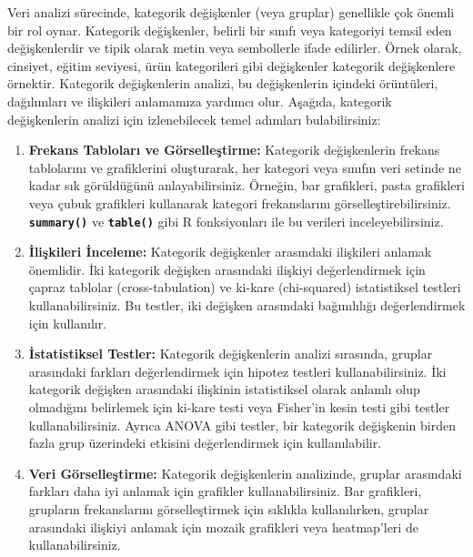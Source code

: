 \documentclass[
  letterpaper,
  DIV=11,
  numbers=noendperiod]{scrreprt}
\begin{document}

Veri analizi sürecinde, kategorik değişkenler (veya gruplar) genellikle
çok önemli bir rol oynar. Kategorik değişkenler, belirli bir sınıfı veya
kategoriyi temsil eden değişkenlerdir ve tipik olarak metin veya
sembollerle ifade edilirler. Örnek olarak, cinsiyet, eğitim seviyesi,
ürün kategorileri gibi değişkenler kategorik değişkenlere örnektir.
Kategorik değişkenlerin analizi, bu değişkenlerin içindeki örüntüleri,
dağılımları ve ilişkileri anlamamıza yardımcı olur. Aşağıda, kategorik
değişkenlerin analizi için izlenebilecek temel adımları bulabilirsiniz:

\begin{enumerate}
\def\labelenumi{\arabic{enumi}.}
\item
  \textbf{Frekans Tabloları ve Görselleştirme:} Kategorik değişkenlerin
  frekans tablolarını ve grafiklerini oluşturarak, her kategori veya
  sınıfın veri setinde ne kadar sık görüldüğünü anlayabilirsiniz.
  Örneğin, bar grafikleri, pasta grafikleri veya çubuk grafikleri
  kullanarak kategori frekanslarını görselleştirebilirsiniz.
  \textbf{\texttt{summary()}} ve \textbf{\texttt{table()}} gibi R
  fonksiyonları ile bu verileri inceleyebilirsiniz.
\item
  \textbf{İlişkileri İnceleme:} Kategorik değişkenler arasındaki
  ilişkileri anlamak önemlidir. İki kategorik değişken arasındaki
  ilişkiyi değerlendirmek için çapraz tablolar (cross-tabulation) ve
  ki-kare (chi-squared) istatistiksel testleri kullanabilirsiniz. Bu
  testler, iki değişken arasındaki bağımlılığı değerlendirmek için
  kullanılır.
\item
  \textbf{İstatistiksel Testler:} Kategorik değişkenlerin analizi
  sırasında, gruplar arasındaki farkları değerlendirmek için hipotez
  testleri kullanabilirsiniz. İki kategorik değişken arasındaki
  ilişkinin istatistiksel olarak anlamlı olup olmadığını belirlemek için
  ki-kare testi veya Fisher'in kesin testi gibi testler
  kullanabilirsiniz. Ayrıca ANOVA gibi testler, bir kategorik değişkenin
  birden fazla grup üzerindeki etkisini değerlendirmek için
  kullanılabilir.
\item
  \textbf{Veri Görselleştirme:} Kategorik değişkenlerin analizinde,
  gruplar arasındaki farkları daha iyi anlamak için grafikler
  kullanabilirsiniz. Bar grafikleri, grupların frekanslarını
  görselleştirmek için sıklıkla kullanılırken, gruplar arasındaki
  ilişkiyi anlamak için mozaik grafikleri veya heatmap'leri de
  kullanabilirsiniz.
\end{enumerate}
\end{document}
